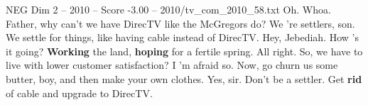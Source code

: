 \begin{textsample}{NEG Dim 2 – 2010 – Score -3.00 – 2010/tv\_com\_2010\_58.txt}  \label{ex:f2_neg_051}
Oh.
Whoa.
Father, why can't we have DirecTV like the McGregors do?
We 're settlers, son.
We settle for things, like having cable instead of DirecTV.
Hey, Jebediah.
How 's it going? \textbf{Working} the land, \textbf{hoping} for a fertile spring.
All right.
So, we have to live with lower customer satisfaction?
I 'm afraid so.
Now, go churn us some butter, boy, and then make your own clothes.
Yes, sir.
Don't be a settler.
Get \textbf{rid} of cable and upgrade to DirecTV.

\end{textsample}
